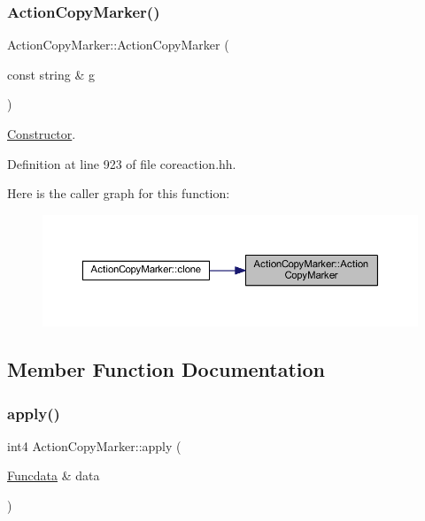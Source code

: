 \subsubsection{\texorpdfstring{ActionCopyMarker()}{ActionCopyMarker()}}
{\footnotesize\ttfamily Action\+Copy\+Marker\+::\+Action\+Copy\+Marker (\begin{DoxyParamCaption}\item[{const string \&}]{g }\end{DoxyParamCaption})\hspace{0.3cm}{\ttfamily [inline]}}



\mbox{\hyperlink{class_constructor}{Constructor}}. 



Definition at line 923 of file coreaction.\+hh.

Here is the caller graph for this function\+:
\nopagebreak
\begin{figure}[H]
\begin{center}
\leavevmode
\includegraphics[width=350pt]{class_action_copy_marker_ad9915844d441460dbd8ccad469b20cb6_icgraph}
\end{center}
\end{figure}


\subsection{Member Function Documentation}
\mbox{\label{class_action_copy_marker_a95c1faed40c03761a5fac5c87af6a272}} 
\subsubsection{\texorpdfstring{apply()}{apply()}}
{\footnotesize\ttfamily int4 Action\+Copy\+Marker\+::apply (\begin{DoxyParamCaption}\item[{\mbox{\hyperlink{class_funcdata}{Funcdata}} \&}]{data }\end{DoxyParamCaption})\hspace{0.3cm}{\ttfamily [virtual]}}



